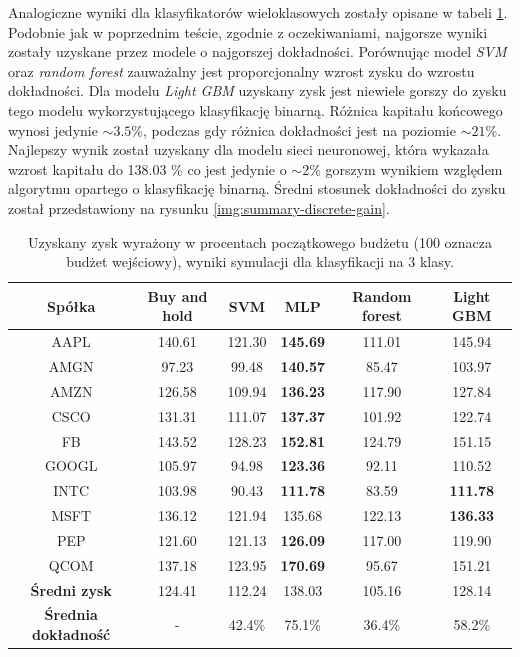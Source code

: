 \documentclass[a4paper, twoside, 11pt, openright]{article}
\begin{document}
Analogiczne wyniki dla klasyfikatorów wieloklasowych zostały opisane w tabeli \ref{tab:comparison_simulation_discrete}. Podobnie jak w poprzednim teście, zgodnie z oczekiwaniami, najgorsze wyniki zostały uzyskane przez modele o najgorszej dokładności. Porównując model \textit{SVM} oraz \textit{random forest} zauważalny jest proporcjonalny wzrost zysku do wzrostu dokładności. Dla modelu \textit{Light GBM} uzyskany zysk jest niewiele gorszy do zysku tego modelu wykorzystującego klasyfikację binarną. Różnica kapitału końcowego wynosi jedynie $\sim 3.5\%$, podczas gdy różnica dokładności jest na poziomie $\sim 21\%$. Najlepszy wynik został uzyskany dla modelu sieci neuronowej, która wykazała wzrost kapitału do 138.03 \% co jest jedynie o $\sim 2\%$ gorszym wynikiem względem algorytmu opartego o klasyfikację binarną. Średni stosunek dokładności do zysku został przedstawiony na rysunku \ref{img:summary-discrete-gain}. 

 \begin{table}[H]
    \centering
    \begin{tabular}{|c|c|c|c|c|c|}
    \hline
        \textbf{Spółka}  & \textbf{Buy and hold} & \textbf{SVM} &  \textbf{MLP}  &  \textbf{Random forest}  &  \textbf{Light GBM} \\ \hline
AAPL & 140.61 & 121.30  & \textbf{145.69}  & 111.01 & 145.94 \\ \hline
AMGN & 97.23 & 99.48  & \textbf{140.57} & 85.47 &  103.97 \\ \hline
AMZN & 126.58 &  109.94 & \textbf{136.23} & 117.90 & 127.84 \\ \hline
CSCO & 131.31 & 111.07  & \textbf{137.37}  & 101.92 & 122.74  \\ \hline
FB   & 143.52 &  128.23 & \textbf{152.81} & 124.79 & 151.15 \\ \hline
GOOGL & 105.97 &  94.98 &  \textbf{123.36} & 92.11 & 110.52 \\ \hline
INTC & 103.98 & 90.43  & \textbf{111.78}  & 83.59 & \textbf{111.78} \\ \hline
MSFT &  136.12 & 121.94  &  135.68  & 122.13 & \textbf{136.33} \\ \hline
PEP  & 121.60 &  121.13 & \textbf{126.09} & 117.00 & 119.90 \\ \hline
QCOM & 137.18 &  123.95 &  \textbf{170.69} & 95.67 & 151.21 \\ \hline \hline
\textbf{Średni zysk} & 124.41 & 112.24 & 138.03 & 105.16 & 128.14 \\  \hline  
\textbf{Średnia dokładność} &  - & 42.4\% & 75.1\% &  36.4\% & 58.2\% \\  \hline  
    \end{tabular}
    \caption{Uzyskany zysk wyrażony w procentach początkowego budżetu (100 oznacza budżet wejściowy), wyniki symulacji dla klasyfikacji na 3 klasy.}
    \label{tab:comparison_simulation_discrete}
\end{table}   
\end{document}
